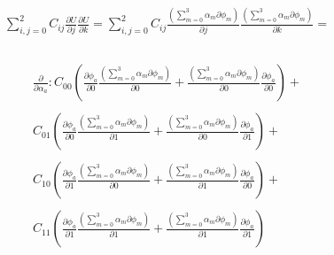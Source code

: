 \documentclass[a4paper,12pt]{article}
\begin{document}
\begin{equation}
    \begin{array}{c}
    \sum_{i,j=0}^2 C_{ij}\frac{\partial U}{\partial j}\frac{\partial U}{\partial k}=
    \sum_{i,j=0}^2 C_{ij}\frac{(\sum_{m=0}^3\alpha_m\partial\phi_m)}
    {\partial j}\frac{(\sum_{m=0}^3\alpha_m\partial\phi_m)}{\partial k}= \\ \\
\end{array}
\end{equation} 

\begin{equation}
    \begin{array}{c}
        \frac{\partial}{\partial \alpha_{a}}:

        C_{00}
        (\frac{\partial\phi_{a}}{\partial 0}\frac{(\sum_{m=0}^3\alpha_m\partial\phi_m)}{\partial 0}+
        \frac{(\sum_{m=0}^3\alpha_m\partial\phi_m)}{\partial 0}\frac{\partial\phi_{a}}{\partial 0})+ \\ \\

        C_{01}
        (\frac{\partial\phi_{a}}{\partial 0}\frac{(\sum_{m=0}^3\alpha_m\partial\phi_m)}{\partial 1}+
        \frac{(\sum_{m=0}^3\alpha_m\partial\phi_m)}{\partial 0}\frac{\partial\phi_{a}}{\partial 1})+ \\ \\

        C_{10}
        (\frac{\partial\phi_{a}}{\partial 1}\frac{(\sum_{m=0}^3\alpha_m\partial\phi_m)}{\partial 0}+
        \frac{(\sum_{m=0}^3\alpha_m\partial\phi_m)}{\partial 1}\frac{\partial\phi_{a}}{\partial 0})+ \\ \\

        C_{11}
        (\frac{\partial\phi_{a}}{\partial 1}\frac{(\sum_{m=0}^3\alpha_m\partial\phi_m)}{\partial 1}+
        \frac{(\sum_{m=0}^3\alpha_m\partial\phi_m)}{\partial 1}\frac{\partial\phi_{a}}{\partial 1})\\ \\
\end{array}
\end{equation} 
\end{document}
